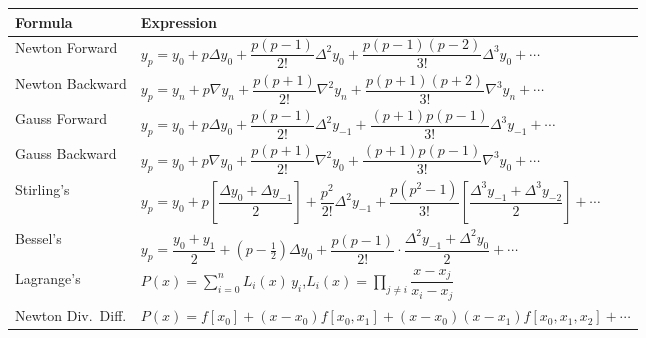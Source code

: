 \documentclass[12pt]{article}
\newcommand{\hcell}[1]{\textbf{\color{white}#1}}
\begin{document}
\begin{center}{\small
\begin{tabular}{p{3cm} p{11cm}}
\toprule
\rowcolor{primary}
\hcell{Formula} & \hcell{Expression} \\
\midrule
\rowcolor{amberbg}
Newton Forward & $y_p = y_0 + p\Delta y_0 + \dfrac{p(p-1)}{2!}\Delta^2 y_0 + \dfrac{p(p-1)(p-2)}{3!}\Delta^3 y_0 + \cdots$ \\[10pt]
Newton Backward & $y_p = y_n + p\nabla y_n + \dfrac{p(p+1)}{2!}\nabla^2 y_n + \dfrac{p(p+1)(p+2)}{3!}\nabla^3 y_n + \cdots$ \\[10pt]
\rowcolor{amberbg}
Gauss Forward & $y_p = y_0 + p\Delta y_0 + \dfrac{p(p-1)}{2!}\Delta^2 y_{-1} + \dfrac{(p+1)p(p-1)}{3!}\Delta^3 y_{-1} + \cdots$ \\[10pt]
Gauss Backward & $y_p = y_0 + p\nabla y_0 + \dfrac{p(p+1)}{2!}\nabla^2 y_0 + \dfrac{(p+1)p(p-1)}{3!}\nabla^3 y_0 + \cdots$ \\[10pt]
\rowcolor{amberbg}
Stirling's & $y_p = y_0 + p\!\left[\dfrac{\Delta y_0+\Delta y_{-1}}{2}\right] + \dfrac{p^2}{2!}\Delta^2 y_{-1} + \dfrac{p(p^2-1)}{3!}\!\left[\dfrac{\Delta^3 y_{-1}+\Delta^3 y_{-2}}{2}\right] + \cdots$ \\[10pt]
Bessel's & $y_p = \dfrac{y_0+y_1}{2} + \!\left(p-\tfrac{1}{2}\right)\Delta y_0 + \dfrac{p(p-1)}{2!}\cdot\dfrac{\Delta^2 y_{-1}+\Delta^2 y_0}{2} + \cdots$ \\[10pt]
\rowcolor{amberbg}
Lagrange's & $P(x) = \displaystyle\sum_{i=0}^n L_i(x)\,y_i$,\quad $L_i(x)=\displaystyle\prod_{j\neq i}\dfrac{x-x_j}{x_i-x_j}$ \\[10pt]
Newton Div.\ Diff. & $P(x) = f[x_0] + (x-x_0)f[x_0,x_1] + (x-x_0)(x-x_1)f[x_0,x_1,x_2] + \cdots$ \\
\bottomrule
\end{tabular}
}\end{center}
\end{document}
